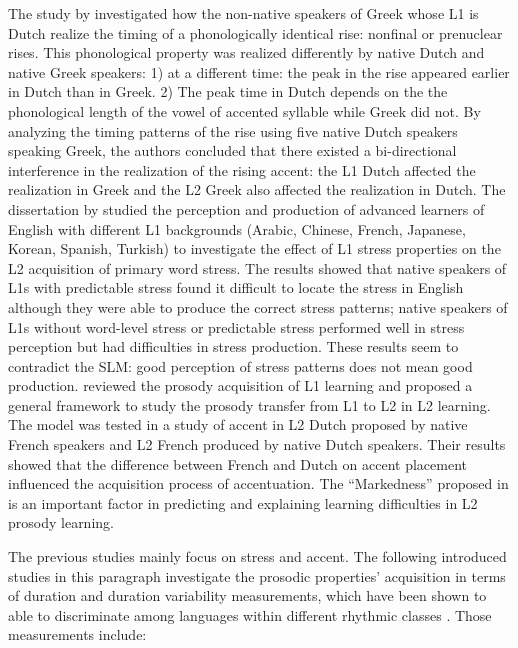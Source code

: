 The study by \cite{mennen2004bi} investigated how the non-native speakers of Greek whose L1 is Dutch realize the timing of a phonologically identical rise: nonfinal or prenuclear rises. This phonological property was realized differently by native Dutch and native Greek speakers: 1) at a different time: the peak in the rise appeared earlier in Dutch than in Greek. 2) The peak time in Dutch depends on the the phonological length of the vowel of accented syllable while Greek did not. By analyzing the timing patterns of the rise using five native Dutch speakers speaking Greek, the authors concluded that there existed a bi-directional interference in the realization of the rising accent: the L1 Dutch affected the realization in Greek and the L2 Greek also affected the realization in Dutch. The dissertation by \cite{altmann2006perception} studied the perception and production of advanced learners of English with different L1 backgrounds (Arabic, Chinese, French, Japanese, Korean, Spanish, Turkish) to investigate the effect of L1 stress properties on the L2 acquisition of primary word stress. The results showed that native speakers of L1s with predictable stress found it difficult to locate the stress in English although they were able to produce the correct stress patterns; native speakers of L1s without word-level stress or predictable stress performed well in stress perception but had difficulties in stress production. These results seem to contradict the SLM: good perception of stress patterns does not mean good production. \cite{rasier2007prosodic} reviewed the prosody acquisition of L1 learning and proposed a general framework to study the prosody transfer from L1 to L2 in L2 learning. The model was tested in a study of accent in L2 Dutch proposed by native French speakers and L2 French produced by native Dutch speakers. Their results showed that the difference between French and Dutch on accent placement influenced the acquisition process of accentuation. The ``Markedness'' proposed in \cite{eckman1977markedness} is an important factor in predicting and explaining learning difficulties in L2 prosody learning.

The previous studies mainly focus on stress and accent. The following introduced studies in this paragraph investigate the prosodic properties' acquisition in terms of duration and duration variability measurements, which have been shown to able to discriminate among languages within different rhythmic classes \cite{ramus1999correlates,grabe2002durational}. Those measurements include:

